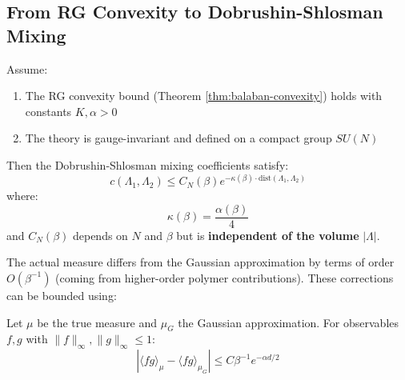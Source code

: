 \subsection{From RG Convexity to Dobrushin-Shlosman Mixing}

\begin{theorem}
\label{thm:mixing-from-rg}
Assume:
\begin{enumerate}
\item The RG convexity bound (Theorem \ref{thm:balaban-convexity}) holds with constants $K, \alpha > 0$
\item The theory is gauge-invariant and defined on a compact group $SU(N)$
\end{enumerate}

Then the Dobrushin-Shlosman mixing coefficients satisfy:
\begin{equation}
c(\Lambda_1, \Lambda_2) \le C_N(\beta) e^{-\kappa(\beta) \cdot \text{dist}(\Lambda_1, \Lambda_2)}
\end{equation}
where:
\begin{equation}
\kappa(\beta) = \frac{\alpha(\beta)}{4}
\end{equation}
and $C_N(\beta)$ depends on $N$ and $\beta$ but is \textbf{independent of the volume} $|\Lambda|$.
\end{theorem}





The actual measure differs from the Gaussian approximation by terms of order $O(\beta^{-1})$ (coming from higher-order polymer contributions). These corrections can be bounded using:

\begin{lemma}
\label{lem:non-gaussian-bound}
Let $\mu$ be the true measure and $\mu_G$ the Gaussian approximation. For observables $f, g$ with $\|f\|_\infty, \|g\|_\infty \le 1$:
\begin{equation}
|\langle fg \rangle_\mu - \langle fg \rangle_{\mu_G}| \le C \beta^{-1} e^{-\alpha d/2}
\end{equation}
\end{lemma}

